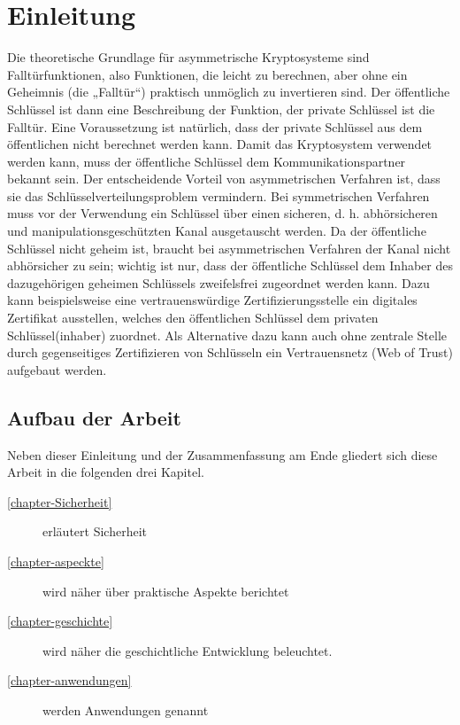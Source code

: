 
\chapter{Einleitung }
Die theoretische Grundlage für asymmetrische Kryptosysteme sind Falltürfunktionen, also Funktionen, die leicht zu berechnen, aber ohne ein Geheimnis (die „Falltür“) praktisch unmöglich zu invertieren sind. Der öffentliche Schlüssel ist dann eine Beschreibung der Funktion, der private Schlüssel ist die Falltür. Eine Voraussetzung ist natürlich, dass der private Schlüssel aus dem öffentlichen nicht berechnet werden kann. Damit das Kryptosystem verwendet werden kann, muss der öffentliche Schlüssel dem Kommunikationspartner bekannt sein.
Der entscheidende Vorteil von asymmetrischen Verfahren ist, dass sie das Schlüsselverteilungsproblem vermindern. Bei symmetrischen Verfahren muss vor der Verwendung ein Schlüssel über einen sicheren, d. h. abhörsicheren und manipulationsgeschützten Kanal ausgetauscht werden. Da der öffentliche Schlüssel nicht geheim ist, braucht bei asymmetrischen Verfahren der Kanal nicht abhörsicher zu sein; wichtig ist nur, dass der öffentliche Schlüssel dem Inhaber des dazugehörigen geheimen Schlüssels zweifelsfrei zugeordnet werden kann. Dazu kann beispielsweise eine vertrauenswürdige Zertifizierungsstelle ein digitales Zertifikat ausstellen, welches den öffentlichen Schlüssel dem privaten Schlüssel(inhaber) zuordnet. Als Alternative dazu kann auch ohne zentrale Stelle durch gegenseitiges Zertifizieren von Schlüsseln ein Vertrauensnetz (Web of Trust) aufgebaut werden.

\section{Aufbau der Arbeit}
Neben dieser Einleitung und der Zusammenfassung am Ende gliedert sich diese Arbeit in die folgenden drei Kapitel.
\begin{description}
  \item[\ref{chapter-Sicherheit}] erläutert Sicherheit 
  \item[\ref{chapter-aspeckte}] wird näher über praktische Aspekte berichtet 
  \item[\ref{chapter-geschichte}] wird näher die geschichtliche Entwicklung beleuchtet.
  \item[\ref{chapter-anwendungen}] werden Anwendungen genannt
\end{description}